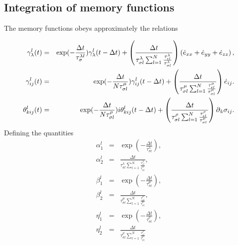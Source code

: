 \documentclass[11pt]{article}
\begin{document}
\subsection{Integration of memory functions}
The memory functions  obeys approximately the relations

\begin{eqnarray}
\gamma^l_{\lambda}(t) & = &
            \exp(-\frac{\Delta t}{\tau^{\lambda l}_{\sigma}})
              \gamma^l_{\lambda}(t-\Delta t)
            +\left(\frac{\Delta t}{\tau^{\lambda}_{\sigma l}
            \sum_{l=1}^N\frac{\tau^{\lambda}_{\epsilon l}}
                             {\tau^{\lambda}_{\sigma l}}}\right)
             \left(\dot{e}_{xx}+ \dot{e}_{yy}+\dot{e}_{zz}\right) ,\nonumber\\
\gamma^l_{ij}(t) & = &
            \exp(-\frac{\Delta t}{N\tau^{\mu}_{\sigma l}})
              \gamma^l_{ij}(t-\Delta t)
            + \left(\frac{\Delta t}{\tau^{\mu}_{\sigma l}
            \sum_{l=1}^N\frac{\tau^{\mu}_{\epsilon l}}{\tau^{\mu}_{\sigma l}}}
            \right) \dot{e}_{ij}.\nonumber\\
\theta^l_{kij}(t) & = &
            \exp(-\frac{\Delta t}{N\tau^{\rho}_{\sigma l}})i
              \theta^l_{kij}(t-\Delta t)
            + \left(\frac{\Delta t}{\tau^{\rho}_{\sigma l}
            \sum_{l=1}^N\frac{\tau^{\rho}_{\epsilon l}}{\tau^{\mu}_{\sigma l}}}
            \right) \mbox{$\partial$}_k \sigma_{ij}.\nonumber\\
\end{eqnarray}
%
Defining the quantities
\begin{eqnarray}
\alpha^l_1 & = & \exp(-\frac{\Delta t}{\tau^{\lambda}_{\sigma l}}),\\
\alpha^l_2 & = & \frac{\Delta t}{\tau^{\lambda}_{\sigma l}
                 \sum_{l=1}^N\frac{\tau^{\lambda}_{\epsilon l}}
                                  {\tau^{\lambda}_{\sigma l}}} ,\\
\beta^l_1  & = &\exp(-\frac{\Delta t}{\tau^{\mu}_{\sigma l}}) ,\\
\beta^l_2  & = &\frac{\Delta t}{\tau^{\mu}_{\sigma l}\sum_{l=1}^N
                \frac{\tau^{\mu}_{\epsilon l}}{\tau^{\mu}_{\sigma l}}},\\
\eta^l_1  & = &\exp(-\frac{\Delta t}{\tau^{\rho}_{\sigma l}}) ,\\
\eta^l_2  & = &\frac{\Delta t}{\tau^{\rho}_{\sigma l}\sum_{l=1}^N
               \frac{\tau^{\rho}_{\epsilon l}}{\tau^{\rho}_{\sigma l}}} 
\end{eqnarray}
\end{document}

